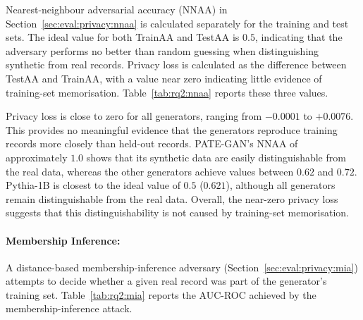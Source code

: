 Nearest-neighbour adversarial accuracy (NNAA) in
Section~\ref{sec:eval:privacy:nnaa} is calculated separately for the
training and test sets. The ideal value for both TrainAA and TestAA is
$0.5$, indicating that the adversary performs no better than random
guessing when distinguishing synthetic from real records. Privacy loss is
calculated as the difference between TestAA and TrainAA, with a value near
zero indicating little evidence of training-set memorisation.
Table~\ref{tab:rq2:nnaa} reports these three values.

\begin{table}[H]
\centering
\small
\caption{Nearest-neighbour adversarial accuracy per generator. Train and
test adversarial accuracy near $0.5$ indicates good resemblance. Privacy
loss (test $-$ train) near $0.0$ indicates no memorisation.}
\label{tab:rq2:nnaa}

\end{table}

Privacy loss is close to zero for all generators, ranging from $-0.0001$
to $+0.0076$. This provides no meaningful evidence that the generators
reproduce training records more closely than held-out records. PATE-GAN's
NNAA of approximately $1.0$ shows that its synthetic data are easily
distinguishable from the real data, whereas the other generators achieve
values between $0.62$ and $0.72$. Pythia-1B is closest to the ideal value
of $0.5$ ($0.621$), although all generators remain distinguishable from
the real data. Overall, the near-zero privacy loss suggests that this
distinguishability is not caused by training-set memorisation.

\paragraph{Membership Inference:}
\label{sec:results:rq2:privacy:mia}

A distance-based membership-inference adversary
(Section~\ref{sec:eval:privacy:mia}) attempts to decide whether a given
real record was part of the generator's training set.
Table~\ref{tab:rq2:mia} reports the AUC-ROC achieved by the membership-inference attack.

\begin{table}[H]
\centering
\small
\caption{Membership-inference attack results per generator. AUC near
$0.5$ and advantage near $0.0$ indicate that the adversary cannot
distinguish training members from non-members.}
\label{tab:rq2:mia}

\end{table}

